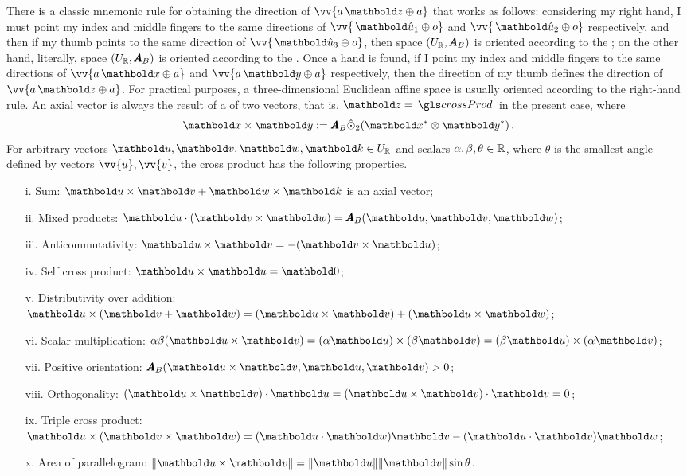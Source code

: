 There is a classic mnemonic rule for obtaining the direction of $\vv{a\,\vto{z}\oplus a}$ that works as follows: considering my right hand, I must point my index and middle fingers to the same directions of $\vv{\,\vun{u}_1\oplus o}$ and $\vv{\,\vun{u}_2\oplus o}$ respectively, and then if my thumb points to the same direction of $\vv{\,\vun{u}_3\oplus o}$, then space $(U_{\mathbb{R}},\pmb{A}_B)$ is oriented according to the ; on the other hand, literally, space $(U_{\mathbb{R}},\pmb{A}_B)$ is oriented according to the . Once a hand is found, if I point my index and middle fingers to the same directions of $\vv{a\,\vto{x}\oplus a}$ and $\vv{a\,\vto{y}\oplus a}$ respectively, then the direction of my thumb defines the direction of $\vv{a\,\vto{z}\oplus a}$. For practical purposes, a three-dimensional Euclidean affine space is usually oriented according to the right-hand rule. An axial vector is always the result of a  of two vectors, that is, $\vto{z}=\gloref{crossProd}$ in the present case, where
\begin{equation}\label{eq:crossProduct}
\vto{x}\times\vto{y} := \tnr{A}_B\hat{\odot}_2 (\vto{x}^*\otimes\vto{y}^*)\,.
\end{equation}
For arbitrary vectors $\vto{u},\vto{v},\vto{w},\vto{k}\in U_\real$ and scalars $\alpha,\beta,\theta\in\mathbb{R}$, where $\theta$ is the smallest angle defined by vectors $\vv{u},\vv{v}$, the cross product has the following properties.
\begin{itemize}
	\setlength\itemsep{.1em}
	\item[i.] Sum: $\vto{u}\times\vto{v}+\vto{w}\times\vto{k}$ is an axial vector;
	\item[ii.] Mixed products: $\vto{u}\cdot(\vto{v}\times\vto{w})=\fua{\tnr{A}_B}{\vto{u},\vto{v},\vto{w}}$;
	\item[iii.] Anticommutativity: $\vto{u}\times\vto{v}=-(\vto{v}\times\vto{u})$;
	\item[iv.] Self cross product: $\vto{u}\times\vto{u}=\vto{0}$;
	\item[v.] Distributivity over addition: $\vto{u}\times(\vto{v}+\vto{w})=(\vto{u}\times\vto{v})+(\vto{u}\times\vto{w})$;
	\item[vi.] Scalar multiplication: $\alpha\beta(\vto{u}\times\vto{v})=(\alpha\vto{u})\times(\beta\vto{v})=(\beta\vto{u})\times(\alpha\vto{v})$;
	\item[vii.] Positive orientation: $\tnr{A}_B(\vto{u}\times\vto{v},\vto{u},\vto{v})>0$;
	\item[viii.] Orthogonality: $(\vto{u}\times\vto{v})\cdot\vto{u}=(\vto{u}\times\vto{v})\cdot\vto{v}=0$;
	\item[ix.] Triple cross product: $\vto{u}\times(\vto{v}\times\vto{w})=(\vto{u}\cdot\vto{w})\vto{v}-(\vto{u}\cdot\vto{v})\vto{w}$;
	\item[x.] Area of parallelogram: $\|\vto{u}\times\vto{v}\|= \|\vto{u} \|\|\vto{v} \|\sin\theta$.
\end{itemize}

